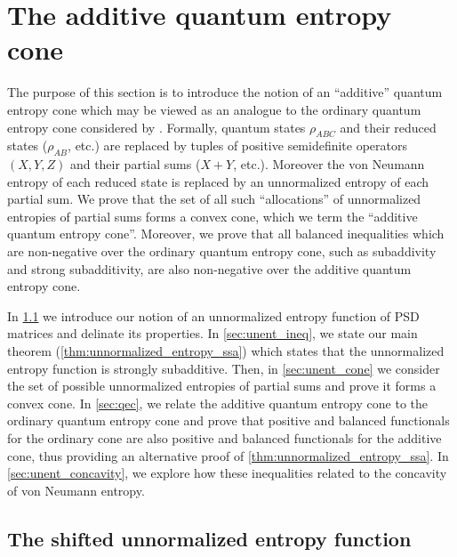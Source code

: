 \documentclass[notitlepage, 10pt]{article}
\begin{document}
\clearpage
\section{The additive quantum entropy cone}

The purpose of this section is to introduce the notion of an ``additive'' quantum entropy cone which may be viewed as an analogue to the ordinary quantum entropy cone considered by \citeauthor{pippenger2003inequalities} \cite{pippenger2003inequalities}.
Formally, quantum states $\rho_{ABC}$ and their reduced states ($\rho_{AB}$, etc.) are replaced by tuples of positive semidefinite operators $(X, Y, Z)$ and their partial sums ($X +Y$, etc.).
Moreover the von Neumann entropy of each reduced state is replaced by an unnormalized entropy of each partial sum.
We prove that the set of all such ``allocations'' of unnormalized entropies of partial sums forms a convex cone, which we term the ``additive quantum entropy cone''.
Moreover, we prove that all balanced inequalities which are non-negative over the ordinary quantum entropy cone, such as subaddivity and strong subadditivity, are also non-negative over the additive quantum entropy cone.

In \cref{sec:unent} we introduce our notion of an unnormalized entropy function of PSD matrices and delinate its properties.
In \cref{sec:unent_ineq}, we state our main theorem (\cref{thm:unnormalized_entropy_ssa}) which states that the unnormalized entropy function is strongly subadditive.
Then, in \cref{sec:unent_cone} we consider the set of possible unnormalized entropies of partial sums and prove it forms a convex cone.
In \cref{sec:qec}, we relate the additive quantum entropy cone to the ordinary quantum entropy cone and prove that positive and balanced functionals for the ordinary cone are also positive and balanced functionals for the additive cone, thus providing an alternative proof of \cref{thm:unnormalized_entropy_ssa}.
In \cref{sec:unent_concavity}, we explore how these inequalities related to the concavity of von Neumann entropy.

\subsection{The shifted unnormalized entropy function}
\label{sec:unent}
\end{document}
